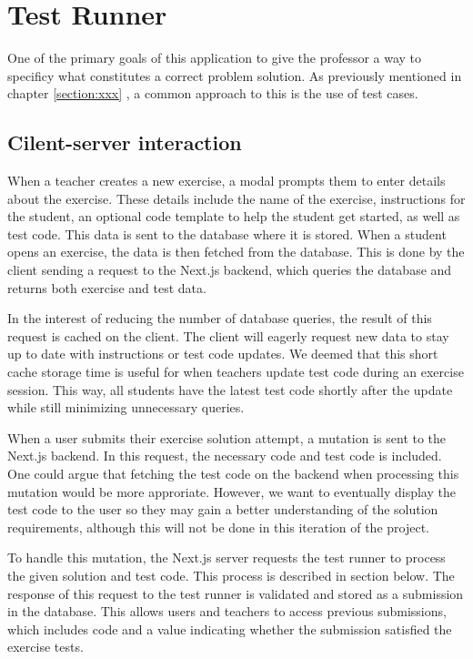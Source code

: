 \chapter{Test Runner} \label{chap:TestRunner}
One of the primary goals of this application to give the professor a way to specificy what constitutes a correct problem solution.
As previously mentioned in chapter \ref{section:xxx} , a common approach to this is the use of test cases.

\section{Cilent-server interaction}
When a teacher creates a new exercise, a modal prompts them to enter details about the exercise.
These details include the name of the exercise, instructions for the student, an optional code template to help the student get started, as well as test code.
This data is sent to the database where it is stored.
When a student opens an exercise, the data is then fetched from the database.
This is done by the client sending a request to the Next.js backend, which queries the database and returns both exercise and test data.

In the interest of reducing the number of database queries, the result of this request is cached on the client. 
The client will eagerly request new data to stay up to date with instructions or test code updates.
We deemed that this short cache storage time is useful for when teachers update test code during an exercise session.
This way, all students have the latest test code shortly after the update while still minimizing unnecessary queries.

When a user submits their exercise solution attempt, a mutation is sent to the Next.js backend.
In this request, the necessary code and test code is included. 
One could argue that fetching the test code on the backend when processing this mutation would be more approriate.
However, we want to eventually display the test code to the user so they may gain a better understanding of the solution requirements, although this will not be done in this iteration of the project.

To handle this mutation, the Next.js server requests the test runner to process the given solution and test code.
This process is described in section \label{sec:test_runner_process} below. 
The response of this request to the test runner is validated and stored as a submission in the database. 
This allows users and teachers to access previous submissions, which includes code and a value indicating whether the submission satisfied the exercise tests.


